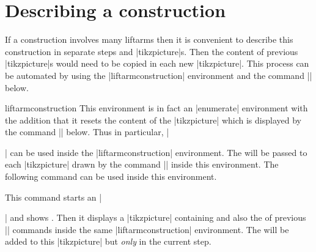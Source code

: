 \documentclass[a4paper,english,dvipsnames]{ltxdoc}
\begin{document}
\section{Describing a construction}
If a construction involves many liftarms then it is convenient to describe this construction in separate steps and |tikzpicture|s. Then the content of previous |tikzpicture|s would need to be copied in each new |tikzpicture|. This process can be automated by using the |liftarmconstruction| environment and the command |\liftarmconstruct| below.
\begin{environment}{{liftarmconstruction}}
This environment is in fact an |enumerate| environment with the addition that it resets the content of the |tikzpicture| which is displayed by the command |\liftarmconstruct| below. Thus in particular, |\item| can be used inside the |liftarmconstruction| environment. The  will be passed to each |tikzpicture| drawn by the command |\liftarmconstruct| inside this environment. The following command can be used inside this environment.
\begin{command}{\liftarmconstruct{}}
This command starts an |\item| and shows . Then it displays a |tikzpicture| containing  and also the  of previous |\liftarmconstruct| commands inside the same |liftarmconstruction| environment. The  will be added to this |tikzpicture| but \emph{only} in the current step.


\end{command}
\end{environment}
\end{document}
